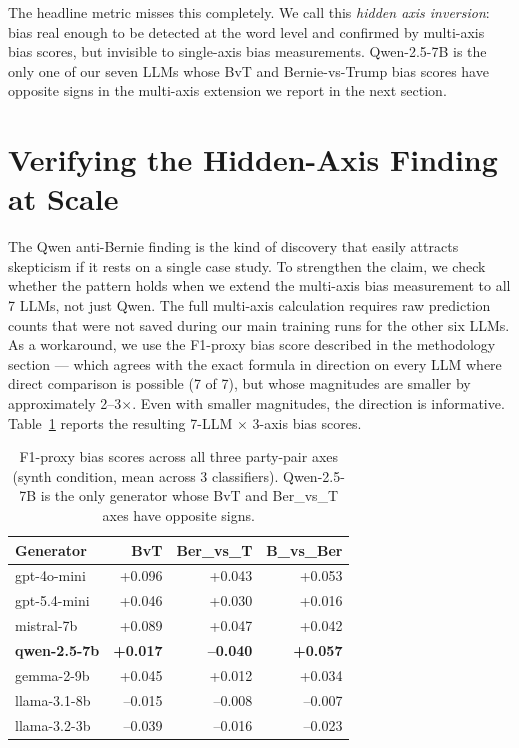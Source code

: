 \documentclass[11pt]{article}
\begin{document}
The headline metric misses this completely. We call this \emph{hidden axis inversion}: bias real enough to be detected at the word level and confirmed by multi-axis bias scores, but invisible to single-axis bias measurements. Qwen-2.5-7B is the only one of our seven LLMs whose BvT and Bernie-vs-Trump bias scores have opposite signs in the multi-axis extension we report in the next section.

\section{Verifying the Hidden-Axis Finding at Scale}
\label{sec:multi-axis}

The Qwen anti-Bernie finding is the kind of discovery that easily attracts skepticism if it rests on a single case study. To strengthen the claim, we check whether the pattern holds when we extend the multi-axis bias measurement to all 7 LLMs, not just Qwen. The full multi-axis calculation requires raw prediction counts that were not saved during our main training runs for the other six LLMs. As a workaround, we use the F1-proxy bias score described in the methodology section --- which agrees with the exact formula in direction on every LLM where direct comparison is possible (7 of 7), but whose magnitudes are smaller by approximately 2--3$\times$. Even with smaller magnitudes, the direction is informative. Table~\ref{tab:multi-axis} reports the resulting 7-LLM $\times$ 3-axis bias scores.

\begin{table}[t]
\centering
\small
\begin{tabular}{lrrr}
\toprule
\textbf{Generator} & \textbf{BvT} & \textbf{Ber\_vs\_T} & \textbf{B\_vs\_Ber} \\
\midrule
gpt-4o-mini   & +0.096 & +0.043 & +0.053 \\
gpt-5.4-mini  & +0.046 & +0.030 & +0.016 \\
mistral-7b    & +0.089 & +0.047 & +0.042 \\
\textbf{qwen-2.5-7b}   & \textbf{+0.017} & \textbf{--0.040} & \textbf{+0.057} \\
gemma-2-9b    & +0.045 & +0.012 & +0.034 \\
llama-3.1-8b  & --0.015 & --0.008 & --0.007 \\
llama-3.2-3b  & --0.039 & --0.016 & --0.023 \\
\bottomrule
\end{tabular}
\caption{F1-proxy bias scores across all three party-pair axes (synth condition, mean across 3 classifiers). Qwen-2.5-7B is the only generator whose BvT and Ber\_vs\_T axes have opposite signs.}
\label{tab:multi-axis}
\end{table}
\end{document}
